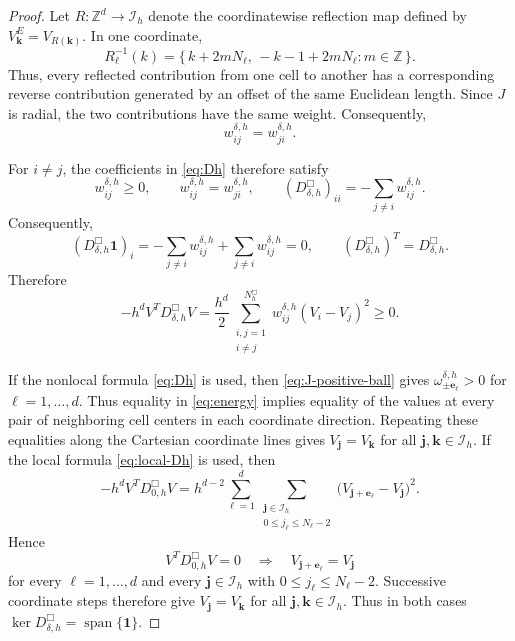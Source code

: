 \documentclass[10pt,a4paper]{amsart}
\newcommand{\ee}{\bm e}
\newcommand{\jj}{\bm j}
\newcommand{\kk}{\bm k}
\newcommand{\one}{\mathbf{1}}
\begin{document}
\begin{proof}
Let $R:\mathbb Z^d\to\mathcal I_h$ denote the coordinatewise reflection map
defined by $V^E_{\kk}=V_{R(\kk)}$.  In one coordinate,
\[
 R_\ell^{-1}(k)
 =
 \{\,k+2mN_\ell,\,-k-1+2mN_\ell:m\in\mathbb Z\,\}.
\]
Thus, every reflected contribution from one cell to another has a
corresponding reverse contribution generated by an offset of the same Euclidean
length.  Since $J$ is radial, the two contributions have the same weight.
Consequently,
\[
w_{ij}^{\delta,h}=w_{ji}^{\delta,h}.
\]

For $i\ne j$, the coefficients in \eqref{eq:Dh} therefore satisfy
\[
 w_{ij}^{\delta,h}\ge0,\qquad w_{ij}^{\delta,h}=w_{ji}^{\delta,h},\qquad
 (D_{\delta,h}^{\Box})_{ii}=-\sum_{j\ne i}w_{ij}^{\delta,h}.
\]
Consequently,
\[
 (D_{\delta,h}^{\Box}\one)_i=-\sum_{j\ne i}w_{ij}^{\delta,h}+\sum_{j\ne i}w_{ij}^{\delta,h}=0,
 \qquad
 (D_{\delta,h}^{\Box})^T=D_{\delta,h}^{\Box}.
\]
Therefore
\[
 -h^dV^TD_{\delta,h}^{\Box}V
 =
 \frac{h^d}{2}
 \sum_{\substack{i,j=1\\ i\ne j}}^{N_h^{\Box}}
 w_{ij}^{\delta,h}(V_i-V_j)^2
 \ge0.
\]

If the nonlocal formula \eqref{eq:Dh} is used, then \eqref{eq:J-positive-ball} gives $\omega_{\pm\ee_\ell}^{\delta,h}>0$ for $\ell=1,\ldots,d$.  Thus equality in \eqref{eq:energy} implies equality of the values at every
pair of neighboring cell centers in each coordinate direction.  Repeating
these equalities along the Cartesian coordinate lines gives $V_{\jj}=V_{\kk}$ for all $\jj,\kk\in\mathcal I_h$.  If the local formula \eqref{eq:local-Dh} is used, then
\[
 -h^dV^TD_{0,h}^{\Box}V
 =
 h^{d-2}
 \sum_{\ell=1}^d
 \sum_{\substack{\jj\in\mathcal I_h\\0\le j_\ell\le N_\ell-2}}
 \big(V_{\jj+\ee_\ell}-V_{\jj}\big)^2.
\]
Hence
\[
 V^TD_{0,h}^{\Box}V=0
 \quad\Longrightarrow\quad
 V_{\jj+\ee_\ell}=V_{\jj}
\]
for every $\ell=1,\ldots,d$ and every
$\jj\in\mathcal I_h$ with $0\le j_\ell\le N_\ell-2$.  Successive coordinate steps therefore give $V_{\jj}=V_{\kk}$ for all $\jj,\kk\in\mathcal I_h$.  Thus in both cases $\ker D_{\delta,h}^{\Box}=\operatorname{span}\{\one\}$.
\end{proof}
\end{document}
